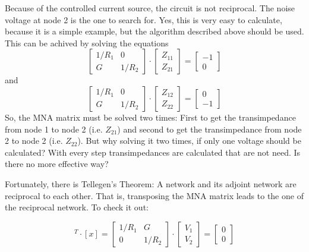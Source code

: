 Because of the controlled current source, the circuit is not
reciprocal.  The noise voltage at node 2 is the one to search
for.  Yes, this
is very easy to calculate, because it is a simple example, but
the algorithm described above should be used.  This can be achived
by solving the equations
\begin{equation}
\begin{bmatrix}
1/R_1 & 0\\
  G   & 1/R_2
\end{bmatrix}
\cdot
\begin{bmatrix}
Z_{11}\\
Z_{21}
\end{bmatrix}
=
\begin{bmatrix}
-1\\
0
\end{bmatrix}
\end{equation}
and
\begin{equation}
\begin{bmatrix}
1/R_1 & 0\\
  G   & 1/R_2
\end{bmatrix}
\cdot
\begin{bmatrix}
Z_{12}\\
Z_{22}
\end{bmatrix}
=
\begin{bmatrix}
0\\
-1
\end{bmatrix}
\end{equation}
So, the MNA matrix must be solved two times: First to get the
transimpedance from node 1 to node 2 (i.e. $Z_{21}$) and second to get
the transimpedance from node 2 to node 2 (i.e.  $Z_{22}$).  But why
solving it two times, if only one voltage should be calculated? With every
step transimpedances are calculated that are not need.  Is there no more
effective way?

\addvspace{12pt}

Fortunately, there is Tellegen's Theorem: A network and its adjoint
network are reciprocal to each other.  That is, transposing
the MNA matrix leads to the one of the reciprocal
network.  To check it out:

\begin{equation}
[A]^T\cdot [x] =
\begin{bmatrix}
1/R_1 & G\\
  0   & 1/R_2
\end{bmatrix}
\cdot
\begin{bmatrix}
V_1\\
V_2
\end{bmatrix}
=
\begin{bmatrix}
0\\
0
\end{bmatrix}
\end{equation}

